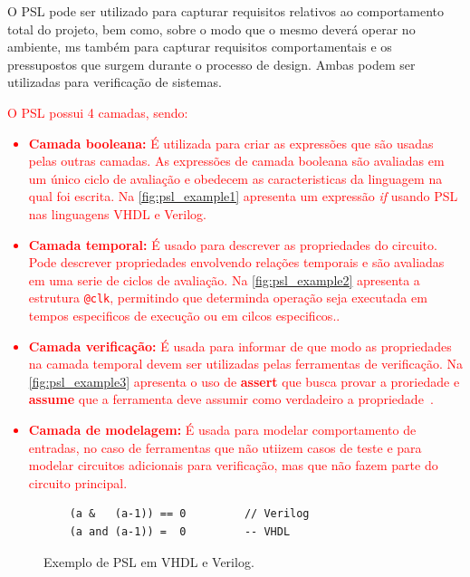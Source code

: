 O PSL pode ser utilizado para capturar requisitos relativos ao comportamento total do projeto, bem como, sobre o modo que o mesmo deverá operar no ambiente, ms também para capturar requisitos comportamentais e os pressupostos que surgem durante o processo de design. Ambas podem ser utilizadas para verificação de sistemas. 

\textcolor{red}{O PSL possui 4 camadas, sendo:
\begin{itemize}
    \item \textbf{Camada booleana:} É utilizada para criar as expressões que são usadas pelas outras camadas. As expressões de camada booleana são avaliadas em um único ciclo de avaliação e obedecem as caracteristicas da linguagem na qual foi escrita. Na \autoref{fig:psl_example1} apresenta um expressão \textit{if} usando PSL nas linguagens VHDL e Verilog\cite{IEEEPSL}.
    \item \textbf{Camada temporal:} É usado para descrever as propriedades do circuito. Pode descrever propriedades envolvendo relações temporais e são avaliadas em uma serie de ciclos de avaliação. Na \autoref{fig:psl_example2} apresenta a estrutura \texttt{@clk}, permitindo que determinda operação seja executada em tempos especificos de execução ou em cilcos especificos.\cite{IEEEPSL}.
    \item \textbf{Camada verificação:} É usada para informar de que modo as propriedades na camada temporal devem ser utilizadas pelas ferramentas de verificação. Na \autoref{fig:psl_example3} apresenta o uso de \textbf{assert} que busca provar a proriedade e \textbf{assume} que a ferramenta deve assumir como verdadeiro a propriedade~\cite{IEEEPSL}.
    \item \textbf{Camada de modelagem:} É usada para modelar comportamento de entradas, no caso de ferramentas que não utiizem casos de teste e para modelar circuitos adicionais para verificação, mas que não fazem parte do circuito principal\cite{IEEEPSL}.
\end{itemize}
}
\begin{figure}[H]
\caption{\label{fig:psl_example1} Exemplo de PSL em VHDL e Verilog.}
	\begin{center}
    \begin{minipage}{0.7\textwidth}
    \begin{lstlisting}       
    (a &   (a-1)) == 0         // Verilog
    (a and (a-1)) =  0         -- VHDL
    \end{lstlisting}
    \end{minipage}
	\end{center}
\end{figure}

